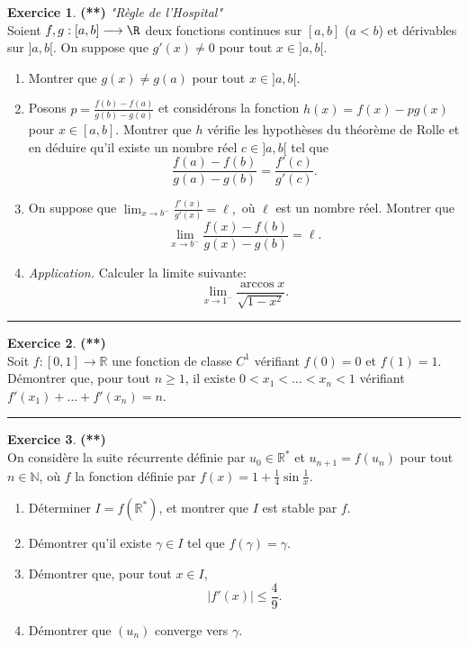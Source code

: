 \documentclass[a4paper,11pt]{article}
\theoremstyle{definition}
\newtheorem{exo}{Exercice} %
\begin{document}
\begin{minipage}{1\linewidth}
	\begin{minipage}[t]{0.48\linewidth}
		\raggedright
		
		\begin{exo}\textbf{(**)} \textit{"Règle de l'Hospital"}\quad\\[0.2cm]
			Soient $f,g :[a , b] \longrightarrow \R$ deux
			fonctions continues
			sur $[a, b]$ ($a < b$) et d\'erivables sur $]a , b[.$ On suppose que
			$g' (x) \neq 0$ pour tout $x \in ]a , b[.$
			
			\begin{enumerate}
				\item
				Montrer que $g (x) \neq g (a)$ pour tout $x \in ]a , b[.$
				
				\item Posons $p = \frac{f (b) - f (a)}{g (b) - g (a)}$ et
				consid\'erons  la fonction $h (x) = f
				(x) - p g (x)$ pour $x \in [a , b].$
				Montrer que $h$ v\'erifie les hypoth\`eses du th\'eor\`eme de Rolle
				et en d\'eduire qu'il existe un nombre r\'eel $c \in ]a , b[$ tel que
				$$ \frac{f (a) - f (b)}{g (a) - g (b)} = \frac{f' (c)}{g' (c)}.$$
				\item On suppose que $\lim_{x \to b^{-}} \frac{f' (x)}{g' (x)} =
				\ell,$ o\`u $\ell $ est un nombre r\'eel.
				Montrer que  $$ \lim_{x \to b^{-}} \frac{f (x) - f (b)}{g (x) - g (b)} = \ell.$$
				\item  \emph{Application.} Calculer la limite suivante:
				$$ \lim_{x \to 1^{-}} \frac{\arccos x}{\sqrt{1- x^{2}}}.$$
			\end{enumerate}
			\centering
			\rule{1\linewidth}{0.6pt}
		\end{exo}
		
		\begin{exo}\textbf{(**)}\quad\\[0.2cm]
			Soit $f:[0,1]\to\mathbb R$ une fonction de classe $C^1$ vérifiant $f(0)=0$ et $f(1)=1$.
			Démontrer que, pour tout $n\geq 1$, il existe $0<x_1<\dots<x_n<1$ vérifiant $f'(x_1)+\dots+f'(x_n)=n$.
			
			\centering
			\rule{1\linewidth}{0.6pt}
		\end{exo}
	
	\begin{exo}\textbf{(**)}\quad\\[0.2cm]
	On considère la suite récurrente définie par $u_0\in \mathbb R^*$ et $u_{n+1}=f(u_n)$ pour tout $n\in\mathbb N$,
	où $f$ la fonction définie par $f(x)=1+\frac 14\sin\frac 1x$.
	\begin{enumerate}
		\item Déterminer $I=f(\mathbb R^*)$, et montrer que $I$ est stable par $f$.
		\item Démontrer qu'il existe $\gamma\in I$ tel que $f(\gamma)=\gamma$.
		\item Démontrer que, pour tout $x\in I$, 
		$$|f'(x)|\leq\frac 49.$$
		\item Démontrer que $(u_n)$ converge vers $\gamma$.
	\end{enumerate}


\end{exo}
\end{minipage}
\end{minipage}
\end{document}
